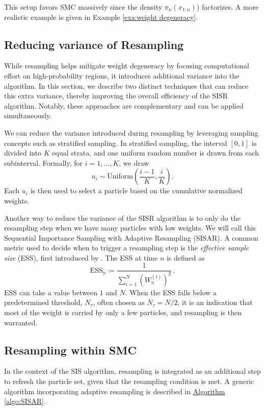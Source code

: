 This setup favors SMC massively since the density $\pi_n(x_{1:n})$) factorizes. A more realistic example is given in Example \ref{exa:weight degeneracy}.

\subsection{Reducing variance of Resampling}
While resampling helps mitigate weight degeneracy by focusing computational effort on high-probability regions, it introduces additional variance into the algorithm. In this section, we describe two distinct techniques that can reduce this extra variance, thereby improving the overall efficiency of the SISR algorithm. Notably, these approaches are complementary and can be applied simultaneously.

We can reduce the variance introduced during resampling by leveraging sampling concepts such as stratified sampling. In stratified sampling, the interval $[0,1]$ is divided into $K$ equal strata, and one uniform random number is drawn from each subinterval. Formally, for $i=1,\dots,K$, we draw 
\[
u_i \sim \text{Uniform}\left(\frac{i-1}{K}, \frac{i}{K}\right).
\]
Each $u_i$ is then used to select a particle based on the cumulative normalized weights.

Another way to reduce the variance of the SISR algorithm is to only do the resampling step when we have many particles with low weights. We will call this Sequential Importance Sampling with Adaptive Resampling (SISAR).
A common metric used to decide when to trigger a resampling step is the \emph{effective sample size} (ESS), first introduced by \cite{Liu}. The ESS at time $n$ is defined as
\[
\text{ESS}_n \coloneq \frac{1}{\sum_{i=1}^N \left(W_n^{(i)}\right)^2}\,.
\]
ESS can take a value between $1$ and $N$. When the ESS falls below a predetermined threshold, $N_\tau$, often chosen as $N_\tau=N/2$, it is an indication that most of the weight is carried by only a few particles, and resampling is then warranted.

\subsection{Resampling within SMC}
In the context of the SIS algorithm, resampling is integrated as an additional step to refresh the particle set, given that the resampling condition is met. A generic algorithm incorporating adaptive resampling is described in \hyperref[algo:SISAR]{Algorithm \ref*{algo:SISAR}}. 

